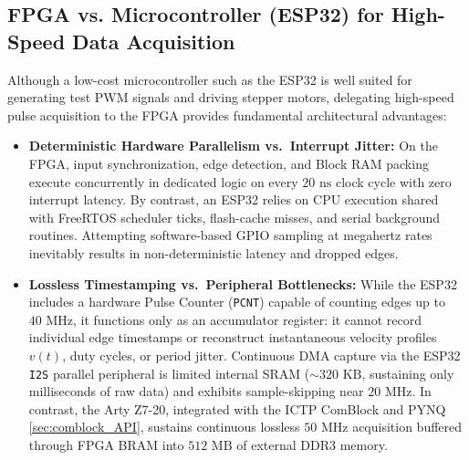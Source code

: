 \subsection{FPGA vs. Microcontroller (ESP32) for High-Speed Data Acquisition}
Although a low-cost microcontroller such as the ESP32 is well suited for generating test PWM signals and driving stepper motors, delegating high-speed pulse acquisition to the FPGA provides fundamental architectural advantages:
\begin{itemize}
    \item \textbf{Deterministic Hardware Parallelism vs.\ Interrupt Jitter:} On the FPGA, input synchronization, edge detection, and Block RAM packing execute concurrently in dedicated logic on every $20\text{ ns}$ clock cycle with zero interrupt latency. By contrast, an ESP32 relies on CPU execution shared with FreeRTOS scheduler ticks, flash-cache misses, and serial background routines. Attempting software-based GPIO sampling at megahertz rates inevitably results in non-deterministic latency and dropped edges.
    \item \textbf{Lossless Timestamping vs.\ Peripheral Bottlenecks:} While the ESP32 includes a hardware Pulse Counter (\texttt{PCNT}) capable of counting edges up to $40\text{ MHz}$, it functions only as an accumulator register: it cannot record individual edge timestamps or reconstruct instantaneous velocity profiles $v(t)$, duty cycles, or period jitter. Continuous DMA capture via the ESP32 \texttt{I2S} parallel peripheral is limited internal SRAM ($\sim 320\text{ KB}$, sustaining only milliseconds of raw data) and exhibits sample-skipping near $20\text{ MHz}$. In contrast, the Arty Z7-20, integrated with the ICTP ComBlock and PYNQ \cref{sec:comblock_API}, sustains continuous lossless $50\text{ MHz}$ acquisition buffered through FPGA BRAM into $512\text{ MB}$ of external DDR3 memory.
\end{itemize}

